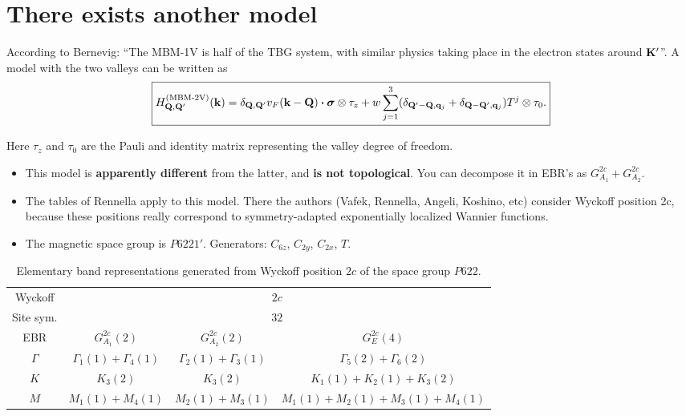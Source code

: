 \section{There exists another model}

According to Bernevig: ``The MBM-1V is half of the TBG system, with similar physics taking place in the electron states around ${\vb{K}}'$''. A model with the two valleys can be written as
$$
\boxed{
H_{\Q, \Q'}^{(\text{MBM-2V})}(\k) =
\delta_{\Q,\Q'} v_F (\k-\Q) \vdot \bm{\sigma} \otimes \tau_z
+ w \sum_{j=1}^{3} (\delta_{\Q'-\Q, \q_j} + \delta_{\Q-\Q', \q_j}) T^j \otimes \tau_0.
}
$$

Here $\tau_z$ and $\tau_0$ are the Pauli and identity matrix representing the valley degree of freedom.

\begin{itemize}
\item This model is \textbf{apparently different} from the latter, and \textbf{is not topological}. You can decompose it in EBR's as $G_{A_1}^{2c} + G_{A_2}^{2c}$.
\item The tables of Rennella apply to this model. There the authors (Vafek, Rennella, Angeli, Koshino, etc) consider Wyckoff position 2c, because these positions really correspond to symmetry-adapted exponentially localized Wannier functions.
\item The magnetic space group is $P6221'$. Generators: $C_{6z}$, $C_{2y}$, $C_{2x}$, $T$.
\end{itemize}

\begin{table}[H]
\caption{Elementary band representations generated from Wyckoff position $2c$ of the space group $P622$.}
\centering
\begin{tabular}{|c|c|c|c|}
\hline
Wyckoff & \multicolumn{3}{c|}{$2c$} \\
\cline{1-4}
Site sym. & \multicolumn{3}{c|}{$32$} \\
\cline{1-4}
EBR & $G_{A_1}^{2c}(2)$ & $G_{A_2}^{2c}(2)$ & $G_{E}^{2c}(4)$  \\
\hline
$\Gamma$ & $\Gamma_1(1) + \Gamma_4(1)$ & $\Gamma_2(1) + \Gamma_3(1)$ & $\Gamma_5(2) + \Gamma_6(2)$ \\
\hline
$K$ & $K_3(2)$ & $K_3(2)$ & $K_1(1) + K_2(1) + K_3(2)$ \\
\hline
$M$ & $M_1(1) + M_4(1)$ & $M_2(1) + M_3(1)$ & $M_1(1) + M_2(1) + M_3(1) + M_4(1)$ \\
\hline
\end{tabular}
\label{tab:ebr-P622}
\end{table}

